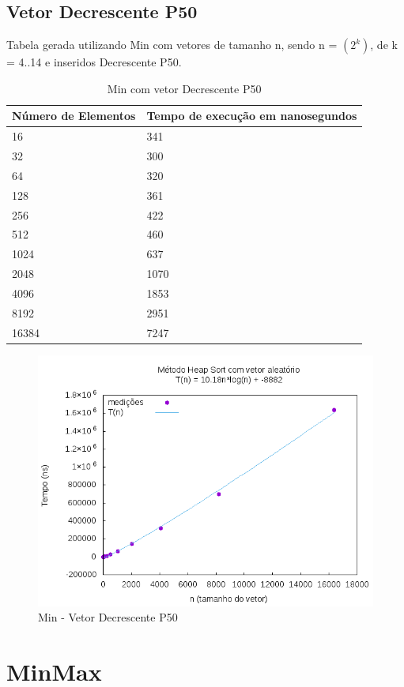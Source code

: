 \documentclass[12pt,a4paper,twoside]{report}
\begin{document}
\subsection{Vetor Decrescente P50}
Tabela gerada utilizando Min com vetores de tamanho n, sendo n = $(2^k)$, de k = 4..14 e inseridos Decrescente P50.
\begin{table}[H]
\centering
\caption{Min com vetor Decrescente P50}
\label{my-label}
\begin{tabular}{|l|l|}
\hline
\multicolumn{1}{|c|}{\textbf{Número de Elementos}} & \multicolumn{1}{c|}{\textbf{Tempo de execução em nanosegundos}} \\ \hline
16 & 341 \\ \hline
32 & 300 \\ \hline
64 & 320 \\ \hline
128 & 361 \\ \hline
256 & 422 \\ \hline
512 & 460 \\ \hline
1024 & 637 \\ \hline
2048 & 1070 \\ \hline
4096 & 1853 \\ \hline
8192 & 2951 \\ \hline
16384 & 7247 \\ \hline
\end{tabular}
\end{table}

\begin{figure}[H]
    \centering
    \includegraphics[width=0.7\linewidth]{graficos/HeapSort/vIntAleatorio/vIntAleatorio.png}
  \caption{Min - Vetor Decrescente P50}
\end{figure}




\section{MinMax}
\end{document}

